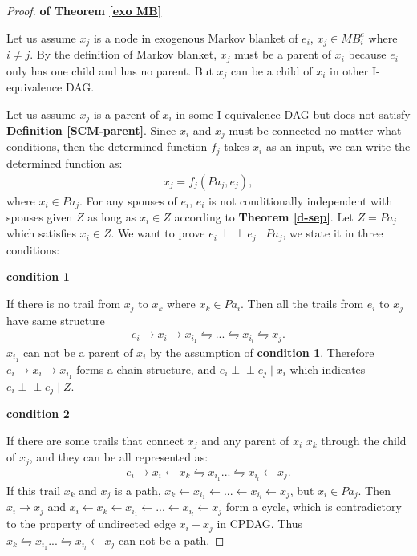 \documentclass[twoside,11pt]{article}
\begin{document}
\begin{proof}{\textbf{of Theorem \ref{exo MB}}}

Let us assume $x_j$ is a node in exogenous Markov blanket of $e_i$, $x_j\in MB^e_i$ where $i\neq j$. By the definition of Markov blanket, $x_j$ must be a parent of $x_i$ because $e_i$ only has one child and has no parent. But $x_j$ can be a child of $x_i$ in other I-equivalence DAG. 

Let us assume $x_j$ is a parent of $x_i$ in some I-equivalence DAG but does not satisfy \textbf{Definition \ref{SCM-parent}}. Since $x_i$ and $x_j$ must be connected no matter what conditions, then the determined function $f_j$ takes $x_i$ as an input, we can write the determined function as:
\begin{align*}
x_j=f_j(Pa_j, e_j),
\end{align*}
where $x_i\in Pa_j$. For any spouses of $e_i$, $e_i$ is not conditionally independent with spouses given $Z$ as long as $x_i\in Z$ according to \textbf{Theorem \ref{d-sep}}. Let $Z=Pa_j$ which satisfies $x_i\in Z$. We want to prove $e_i\perp\!\!\!\perp e_j\mid Pa_j$, we state it in three conditions:

\textbf{condition 1}

If there is no trail from $x_j$ to $x_k$ where $x_k\in Pa_i$. Then all the trails from $e_i$ to $x_j$ have same structure
\begin{align}\label{3}
e_i\to x_i\to x_{i_1}\leftrightharpoons ...\leftrightharpoons x_{i_l}\leftrightharpoons x_j.
\end{align}
$x_{i_1}$ can not be a parent of $x_i$ by the assumption of \textbf{condition 1}. Therefore $e_i\to x_i\to x_{i_1}$ forms a chain structure, and $e_i\perp\!\!\!\perp e_j\mid x_i$ which indicates $e_i\perp\!\!\!\perp e_j\mid Z$.

\textbf{condition 2}

If there are some trails that connect $x_j$ and any parent of $x_i$ $x_k$ through the child of $x_j$, and they can be all represented as:
\begin{align}\label{4}
e_i\to x_i\gets x_k \leftrightharpoons x_{i_1}... \leftrightharpoons x_{i_l}\gets x_j.
\end{align}
If this trail $x_k$ and $x_j$ is a path, $x_k\gets x_{i_1}\gets ... \gets x_{i_l}\gets x_j$, but $x_i\in Pa_j$. Then $x_i\to x_j$ and $x_i\gets x_k\gets x_{i_1}\gets ... \gets x_{i_l}\gets x_j$ form a cycle, which is contradictory to the property of undirected edge $x_i-x_j$ in CPDAG. Thus $x_k \leftrightharpoons x_{i_1}... \leftrightharpoons x_{i_l}\gets x_j$ can not be a path.


\end{proof}
\end{document}

